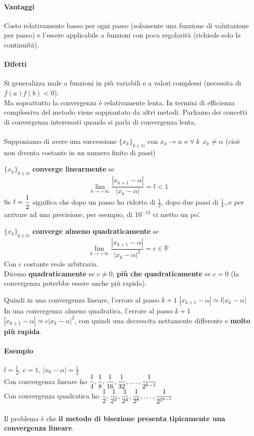 \documentclass[10pt]{book}
\begin{document}
\paragraph{Vantaggi} Costo relativamente basso per ogni passo (solamente una funzione di valutazione per passo) e l'essere applicabile a funzioni con poca regolarità (richiede solo la continuità).
\paragraph{Difetti} Si generalizza male a funzioni in più variabili e a valori complessi (necessita di $f(a)f(b)<0$).\\
Ma soprattutto la convergenza è relativamente lenta. In termini di efficienza complessiva del metodo viene soppiantato da altri metodi. Parliamo dei concetti di convergenza interessati quando si parla di convergenza lenta.\\\\
Supponiamo di avere una successione $\{x_k\}_{k \in \mathbb{N}}$ con $x_k \to \alpha$ e $\forall\:k\:\:x_k \neq \alpha$ (cioè non diventa costante in un numero finito di passi)
\begin{list}{}{}
	\item $\{x_k\}_{k \in \mathbb{N}}$ \textbf{converge linearmente} se 
	$$\lim_{k\to+\infty} \frac{|x_{k+1} - \alpha|}{|x_k - \alpha|} = l < 1$$
	Se $l = \mathlarger{\frac{1}{2}}$ significa che dopo un passo ho ridotto di $\frac{1}{2}$, dopo due passi di $\frac{1}{4}$\ldots e per arrivare ad una precisione, per esempio, di $10^{-12}$ ci metto un po'.
	\item \item $\{x_k\}_{k \in \mathbb{N}}$ \textbf{converge almeno quadraticamente} se 
	$$\lim_{k\to+\infty} \frac{|x_{k+1} - \alpha|}{|x_k - \alpha|^2} = c \in \mathbb{R}$$
	Con $c$ costante reale arbitraria.\\
	Diremo \textbf{quadraticamente} se $c\neq 0$, \textbf{più che quadraticamente} se $c=0$ (la convergenza potrebbe essere anche più rapida).
\end{list}
\pagebreak
Quindi in una convergenza lineare, l'errore al passo $k+1$ $|x_{k+1} - \alpha| \simeq l|x_k - \alpha|$\\
In una convergenza almeno quadratica, l'errore al passo $k+1$ $|x_{k+1} - \alpha| \simeq c|x_k - \alpha|^2$, con quindi una decrescita nettamente differente e \textbf{molto più rapida}.
\paragraph{Esempio} $l = \frac{1}{2}$, $c = 1$, $|x_0 - \alpha| = \frac{1}{2}$\\
Con convergenza lineare ho $\mathlarger{\frac{1}{4}, \frac{1}{8}, \frac{1}{16}, \frac{1}{32},\ldots,\frac{1}{2^{k-1}}}$\\
Con convergenza quadratica ho $\mathlarger{\frac{1}{2}, \frac{1}{2^2}, \frac{1}{2^4},\frac{1}{2^8}, \ldots, \frac{1}{2^{2^{k-1}}}}$\\\\
Il problema è che \textbf{il metodo di bisezione presenta tipicamente una convergenza lineare}.
\end{document}
